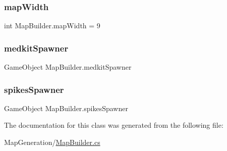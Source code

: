 \mbox{\label{class_map_builder_a00a96026df849c4657812f208d202e65}} 
\subsubsection{\texorpdfstring{map\+Width}{mapWidth}}
{\footnotesize\ttfamily int Map\+Builder.\+map\+Width = 9}

\mbox{\label{class_map_builder_a1fa1d133a609bdd4000f96521f4a216d}} 
\subsubsection{\texorpdfstring{medkit\+Spawner}{medkitSpawner}}
{\footnotesize\ttfamily Game\+Object Map\+Builder.\+medkit\+Spawner}

\mbox{\label{class_map_builder_a9bdd358b678d7642883bee3efe84af76}} 
\subsubsection{\texorpdfstring{spikes\+Spawner}{spikesSpawner}}
{\footnotesize\ttfamily Game\+Object Map\+Builder.\+spikes\+Spawner}



The documentation for this class was generated from the following file\+:\begin{DoxyCompactItemize}
\item 
Map\+Generation/\mbox{\hyperlink{_map_builder_8cs}{Map\+Builder.\+cs}}\end{DoxyCompactItemize}
